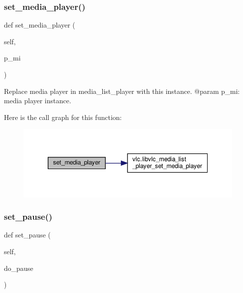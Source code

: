 \subsubsection{\texorpdfstring{set\+\_\+media\+\_\+player()}{set\_media\_player()}}
{\footnotesize\ttfamily def set\+\_\+media\+\_\+player (\begin{DoxyParamCaption}\item[{}]{self,  }\item[{}]{p\+\_\+mi }\end{DoxyParamCaption})}

\begin{DoxyVerb}Replace media player in media_list_player with this instance.
@param p_mi: media player instance.
\end{DoxyVerb}
 Here is the call graph for this function\+:
\nopagebreak
\begin{figure}[H]
\begin{center}
\leavevmode
\includegraphics[width=339pt]{classvlc_1_1_media_list_player_a27e9842493d76d15873d9f12d4b93440_cgraph}
\end{center}
\end{figure}
\mbox{\label{classvlc_1_1_media_list_player_ab35d8dc9f1faad46ff204872a225ad49}} 
\subsubsection{\texorpdfstring{set\+\_\+pause()}{set\_pause()}}
{\footnotesize\ttfamily def set\+\_\+pause (\begin{DoxyParamCaption}\item[{}]{self,  }\item[{}]{do\+\_\+pause }\end{DoxyParamCaption})}

